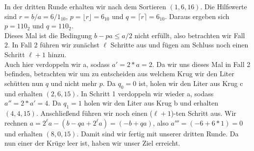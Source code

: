 In der dritten Runde erhalten wir nach dem Sortieren $(1, 6, 16)$. Die Hilfswerte sind $r=b/a=6/1_{10}$, $p=\lfloor r \rfloor = 6_{10}$ und $q=\lceil r \rceil = 6_{10}$. Daraus ergeben sich $p = 110_{2}$ und $q = 110_{2}$. \\
Dieses Mal ist die Bedingung $b-pa \leq a/2$ nicht erfüllt, also betrachten wir Fall 2. In Fall 2 führen wir zunächst $\ell$ Schritte aus und fügen am Schluss noch einen Schritt $\ell +1$ hinzu. \\
Auch hier verdoppeln wir a, sodass $a'=2*a=2$. Da wir uns dieses Mal in Fall 2 befinden, betrachten wir um zu entscheiden aus welchem Krug wir den Liter schütten nun $q$ und nicht mehr $p$. Da $q_0=0$ ist, holen wir den Liter aus Krug c und erhalten $(2, 6, 15)$. In Schritt 1 verdoppeln wir wieder a, sodass $a''=2*a'=4$. Da $q_1=1$ holen wir den Liter aus Krug b und erhalten $(4, 4, 15)$. Anschließend führen wir noch einen ($\ell+1$)-ten Schritt aus. Wir rechnen $a = 2^\ell a- (b-qa+2^\ell a) = (-b+qa)$, also $a'''=(-6+6*1)=0$ und erhalten $(8,0,15)$. %
Damit sind wir fertig mit unserer dritten Runde. Da nun einer der Krüge leer ist, haben wir unser Ziel erreicht.\\

